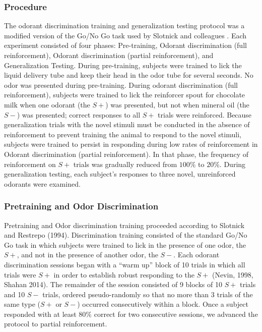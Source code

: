 \subsubsection*{Procedure}
\label{sec:methods_procedure}
The odorant discrimination training and generalization testing protocol was a modified version of the Go/No Go task used by Slotnick and colleagues \cite{18428626}. Each experiment consisted of four phases: Pre-training, Odorant discrimination (full reinforcement), Odorant discrimination (partial reinforcement), and Generalization Testing. During pre-training, subjects were trained to lick the liquid delivery tube and keep their head in the odor tube for several seconds. No odor was presented during pre-training. During odorant discrimination (full reinforcement), subjects were trained to lick the reinforcer spout for chocolate milk when one odorant (the $S+$) was presented, but not when mineral oil (the $S-$) was presented; correct responses to all $S+$ trials were reinforced. Because generalization trials with the novel stimuli must be conducted in the absence of reinforcement to prevent training the animal to respond to the novel stimuli, subjects were trained to persist in responding during low rates of reinforcement in Odorant discrimination (partial reinforcement). In that phase, the frequency of reinforcement on $S+$ trials was gradually reduced from $100\%$ to $20\%$. During generalization testing, each subject's responses to three novel, unreinforced odorants were examined.

\subsubsection*{Pretraining and Odor Discrimination}
\label{sec:methods_pretraining}
Pretraining and Odor discrimination training proceeded according to Slotnick and Restrepo (1994). Discrimination training consisted of the standard Go/No Go task in which subjects were trained to lick in the presence of one odor, the $S+$, and not in the presence of another odor, the $S-$.  Each odorant discrimination sessions began with a ``warm up'' block of 10 trials in which all trials were $S+$ in order to establish robust responding to the $S+$  (Nevin, 1998, Shahan 2014).  The remainder of the session consisted of 9 blocks of 10 $S+$ trials and 10 $S-$ trials, ordered pseudo-randomly so that no more than 3 trials of the same type ($S+$ or $S-$) occurred consecutively within a block. Once a subject responded with at least $80\%$ correct for two consecutive sessions, we advanced the protocol to partial reinforcement.

